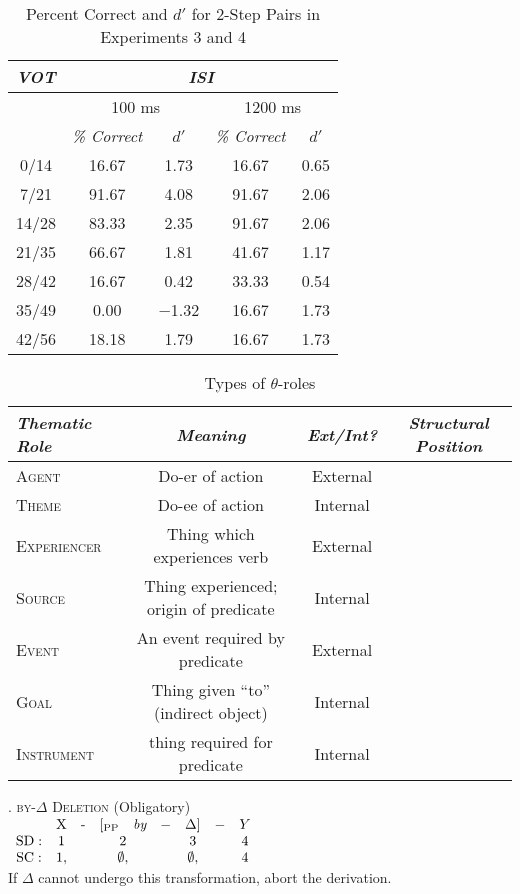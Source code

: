 \documentclass[12pt, twoside]{article}
\begin{document}
	\begin{table}[ht]
		\centering
		\begin{tabular}[ht]{ccccc}
			\hline
			\emph{VOT}&\multicolumn{4}{c}{\emph{ISI}}\\
			\hline
			&\multicolumn{2}{c}{100 ms}&\multicolumn{2}{c}{1200 ms}\\
			&\emph{\% Correct}&$d'$&\emph{\% Correct}&$d'$\\
			\hline
			0/14&16.67&1.73&16.67&0.65\\
			7/21&91.67&4.08&91.67&2.06\\
			14/28&83.33&2.35&91.67&2.06\\
			21/35&66.67&1.81&41.67&1.17\\
			28/42&16.67&0.42&33.33&0.54\\
			35/49&0.00&$-$1.32&16.67&1.73\\
			42/56&18.18&1.79&16.67&1.73\\
			\hline
		\end{tabular}
		\caption{Percent Correct and $d'$ for 2-Step Pairs in Experiments 3 and 4}
		\label{tab:english2stepDIS}
	\end{table}


	
	\begin{table}[ht]
	  \centering
	  \begin{tabular}[ht]{lccc}
	    \textit{Thematic Role}&\textit{Meaning}&\textit{Ext/Int?}&\textit{Structural Position}\\
	\hline
	     \textsc{Agent}&Do-er of action&External&\\
	     \textsc{Theme}&Do-ee of action&Internal&\\
	     \textsc{Experiencer}&Thing which experiences verb&External&\\
	     \textsc{Source}&Thing experienced; origin of predicate&Internal&\\
	     \textsc{Event}&An event required by predicate&External&\\
	     \textsc{Goal}&Thing given ``to'' (indirect object)&Internal&\\
	     \textsc{Instrument}&thing required for predicate&Internal&\\
	     \hline
	  \end{tabular}
	  \caption{Types of $\theta$-roles}
	  \label{tab:types}
	\end{table}
	
	
	\ex. \textsc{by}-$\Delta$ \textsc{Deletion} (Obligatory)\\$\begin{array}{cccccccc}
	&\textrm{X}&\textrm{-}&[_{\textrm{PP}} \quad \emph{by}&-&\Delta]&-&Y\\
	\textrm{SD}:&1&&2&&3&&4\\
	\textrm{SC}:&1,&&\emptyset,&&\emptyset,&&4
	\end{array}$\\If $\Delta$ cannot undergo this transformation, abort the derivation.
	
\end{document}
